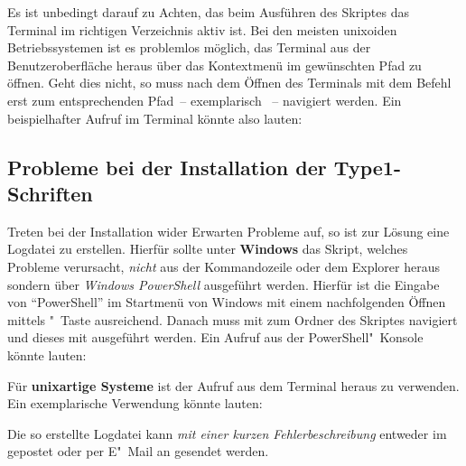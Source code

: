 Es ist unbedingt darauf zu Achten, das beim Ausführen des Skriptes das Terminal 
im richtigen Verzeichnis aktiv ist. Bei den meisten unixoiden Betriebssystemen 
ist es problemlos möglich, das Terminal aus der Benutzeroberfläche heraus über 
das Kontextmenü im gewünschten Pfad zu öffnen. Geht dies nicht, so muss nach 
dem Öffnen des Terminals mit dem Befehl  erst zum entsprechenden 
Pfad~-- exemplarisch ~-- 
navigiert werden. Ein beispielhafter Aufruf im Terminal könnte also lauten:
%
\begin{quoting}
\RET*%
\RET%
\end{quoting}



\subsection{Probleme bei der Installation der Type1-Schriften}

Treten bei der Installation wider Erwarten Probleme auf, so ist zur Lösung eine 
Logdatei zu erstellen. Hierfür sollte unter \textbf{Windows} das Skript, 
welches Probleme verursacht, \emph{nicht} aus der Kommandozeile oder dem 
Explorer heraus sondern über \emph{Windows PowerShell} ausgeführt werden. 
Hierfür ist die Eingabe von \enquote{PowerShell} im Startmenü von Windows mit 
einem nachfolgenden Öffnen mittels "~Taste ausreichend. 
Danach muss mit  zum Ordner des Skriptes navigiert und dieses mit 
ausgeführt werden. Ein Aufruf aus der PowerShell"~Konsole könnte lauten:
%
\begin{quoting}
\RET*%
\RET%
\end{quoting}
%
Für \textbf{unixartige Systeme} ist der Aufruf 
 aus dem Terminal heraus zu 
verwenden. Ein exemplarische Verwendung könnte lauten:
%
\begin{quoting}
\RET*%
\RET%
\end{quoting}
%
Die so erstellte Logdatei kann \emph{mit einer kurzen Fehlerbeschreibung} 
entweder im \GitHubRepo gepostet oder per E"~Mail an \mailto{\TUDScriptContact}
gesendet werden.



